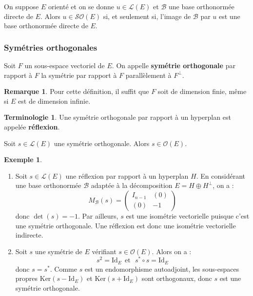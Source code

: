 \documentclass[french]{article}
\newcommand{\st}{^*}
\renewcommand{\ker}{\text{Ker}}
\theoremstyle{plain}
\theoremstyle{definition}
\newtheorem*{ex}{Exemple}
\newtheorem*{rmq}{Remarque}
\newtheorem*{terminologie}{Terminologie}
\theoremstyle{remark}
\begin{document}
\begin{prop}
	On suppose $E$ orienté et on se donne $u\in\mathcal{L}(E)$ et $\mathcal{B}$ une base orthonormée directe de $E$. Alors $u\in\mathcal{SO}(E)$ si, et seulement si, l'image de $\mathcal{B}$ par $u$ est une base orthonormée directe de $E$.
\end{prop}

\subsubsection*{Symétries orthogonales}

\begin{dfn}
	Soit $F$ un sous-espace vectoriel de $E$. On appelle \textbf{symétrie orthogonale} par rapport à $F$ la symétrie par rapport à $F$ parallèlement à $F^\bot$.
\end{dfn}

\begin{rmq}
	Pour cette définition, il suffit que $F$ soit de dimension finie, même si $E$ est de dimension infinie.
\end{rmq}

\begin{terminologie}
	Une symétrie orthogonale par rapport à un hyperplan est appelée \textbf{réflexion}.
\end{terminologie}

\begin{prop}
	Soit $s\in\mathcal{L}(E)$ une symétrie orthogonale. Alors $s\in\mathcal{O}(E)$.
\end{prop}

\begin{ex}
	\begin{enumerate}
		\item Soit $s\in\mathcal{L}(E)$ une réflexion par rapport à un hyperplan $H$. En considérant une base orthonormée $\mathcal{B}$ adaptée à la décomposition $E=H\oplus H^\bot$, on a : $$M_\mathcal{B}(s)=\begin{pmatrix}
			I_{n-1}&(0)\\
			(0)&-1
		\end{pmatrix}$$ donc $\det(s)=-1$. Par ailleurs, $s$ est une isométrie vectorielle puisque c'est une symétrie orthogonale. Une réflexion est donc une isométrie vectorielle indirecte.
		\item Soit $s$ une symétrie de $E$ vérifiant $s\in\mathcal{O}(E)$. Alors on a : $$s^2=\text{Id}_E\ \ \text{et}\ \ \ s\st\circ s=\text{Id}_E$$ donc $s=s\st$. Comme $s$ est un endomorphisme autoadjoint, les sous-espaces propres $\ker(s-\text{Id}_E)$ et $\ker(s+\text{Id}_E)$ sont orthogonaux, donc $s$ est une symétrie orthogonale.
	\end{enumerate}
\end{ex}
\end{document}
